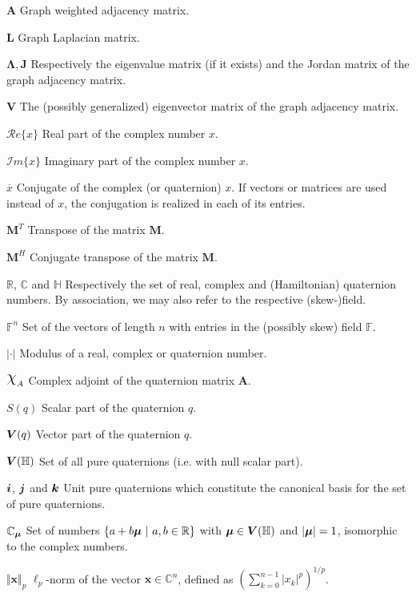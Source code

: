 \documentclass[
	11pt,				%
	openright,			%
	twoside,			%
	a4paper,			%
	french,				%
	brazil,			%
	english				%
	]{abntex2}
\begin{document}
\begin{simbolos}
    \item[$ \mathbf{A} $] Graph weighted adjacency matrix.
    \item[$ \mathbf{L} $] Graph Laplacian matrix.
    \item[$ \mathbf{\Lambda}, \mathbf{J} $] Respectively the eigenvalue matrix (if it exists) and the Jordan matrix of the graph adjacency matrix.
    \item[$ \mathbf{V} $] The (possibly generalized) eigenvector matrix of the graph adjacency matrix.
    \item[$\mathcal{R}e \{ x \}$] Real part of the complex number $x$.
    \item[$\mathcal{I}m \{ x \}$] Imaginary part of the complex number $x$.
    \item[$ \overline{x} $] Conjugate of the complex (or quaternion) $x$. If vectors or matrices are used instead of $x$, the conjugation is realized in each of its entries.
    \item[$\mathbf{M}^T$] Transpose of the matrix $\mathbf{M}$.
    \item[$\mathbf{M}^H$] Conjugate transpose of the matrix $\mathbf{M}$.
    \item[$\mathbb{R}$, $\mathbb{C}$ and $\mathbb{H}$] Respectively the set of real, complex and (Hamiltonian) quaternion numbers. By association, we may also refer to the respective (skew-)field.
    \item[$\mathbb{F}^n$] Set of the vectors of length $n$ with entries in the (possibly skew) field $\mathbb{F}$.
    \item[$ | \cdot | $] Modulus of a real, complex or quaternion number.
    \item[$ \rchi_A $] Complex adjoint of the quaternion matrix $ \mathbf{A} $.
    \item[$ S(q) $] Scalar part of the quaternion $q$.
    \item[$ \boldsymbol{V}(q) $] Vector part of the quaternion $q$.
    \item[$ \boldsymbol{V}(\mathbb{H}) $] Set of all pure quaternions (i.e. with null scalar part).
    \item[$ \boldsymbol{i} $, $ \boldsymbol{j} $ and $ \boldsymbol{k} $] Unit pure quaternions which constitute the canonical basis for the set of pure quaternions.
    \item[$ \mathbb{C}_{\boldsymbol{\mu}}$] Set of numbers $\{ a + b\boldsymbol{\mu} \ | \ a, b \in \mathbb{R} \}$ with $\boldsymbol{\mu} \in \boldsymbol{V}(\mathbb{H})$ and $|\boldsymbol{\mu}| = 1$, isomorphic to the complex numbers.
    \item[$ \Vert \mathbf{x}\Vert_p $] $ \ell_p $-norm of the vector $\mathbf{x} \in \mathbb{C}^n$, defined as $\left(\sum_{k=0}^{n-1} |x_k|^p\right)^{1/p}$.
\end{simbolos}
\end{document}
